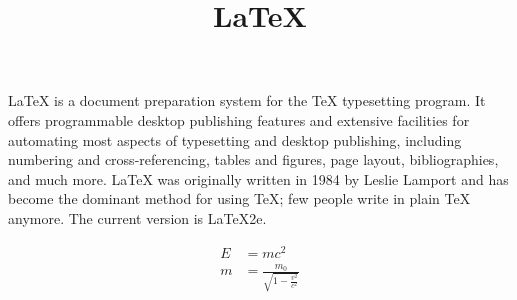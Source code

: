 \documentclass[12pt]{article}
\title{\LaTeX}
\date{}
\begin{document}
  \maketitle
  \LaTeX{} is a document preparation system for the \TeX{}
  typesetting program. It offers programmable desktop publishing
  features and extensive facilities for automating most aspects of
  typesetting and desktop publishing, including numbering and
  cross-referencing, tables and figures, page layout, bibliographies,
  and much more. \LaTeX{} was originally written in 1984 by Leslie
  Lamport and has become the dominant method for using \TeX; few
  people write in plain \TeX{} anymore. The current version is
  \LaTeX2e.

  \begin{align}
    E &= mc^2                              \\
    m &= \frac{m_0}{\sqrt{1-\frac{v^2}{c^2}}}
  \end{align}
\end{document}
